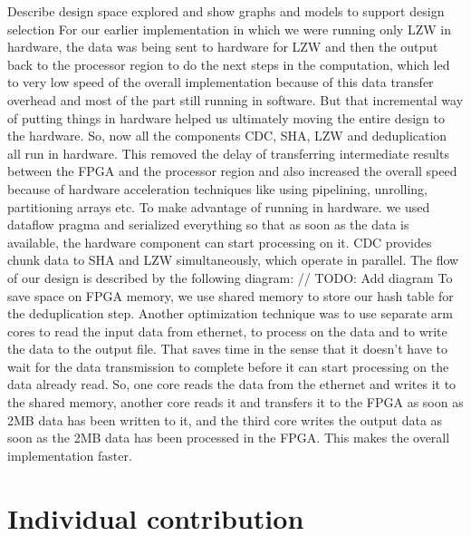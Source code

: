 \documentclass{article}
\begin{document}
Describe design space explored and show graphs and models to support design selection
For our earlier implementation in which we were running only LZW in hardware, the data was being sent to hardware for LZW and then the output back to the processor region to do the next steps in the computation, which led to very low speed of the overall implementation because of this data transfer overhead and most of the part still running in software. 
\newline
But that incremental way of putting things in hardware helped us ultimately moving the entire design to the hardware. So, now all the components CDC, SHA, LZW and deduplication all run in hardware. This removed the delay of transferring intermediate results between the FPGA and the processor region and also increased the overall speed because of hardware acceleration techniques like using pipelining, unrolling, partitioning arrays etc.
\newline\newline
To make advantage of running in hardware. we used dataflow pragma and serialized everything so that as soon as the data is available, the hardware component can start processing on it. 
\newline
CDC provides chunk data to SHA and LZW simultaneously, which operate in parallel. The flow of our design is described by the following diagram:
\newline\newline
// TODO: Add diagram
\newline\newline
To save space on FPGA memory, we use shared memory to store our hash table for the deduplication step.
Another optimization technique was to use separate arm cores to read the input data from ethernet, to process on the data and to write the data to the output file. 
\newline
That saves time in the sense that it doesn't have to wait for the data transmission to complete before it can start processing on the data already read. So, one core reads the data from the ethernet and writes it to the shared memory, another core reads it and transfers it to the FPGA as soon as 2MB data has been written to it, and the third core writes the output data as soon as the 2MB data has been processed in the FPGA. This makes the overall implementation faster. 
\newline\newline

\section{Individual contribution}
\end{document}
